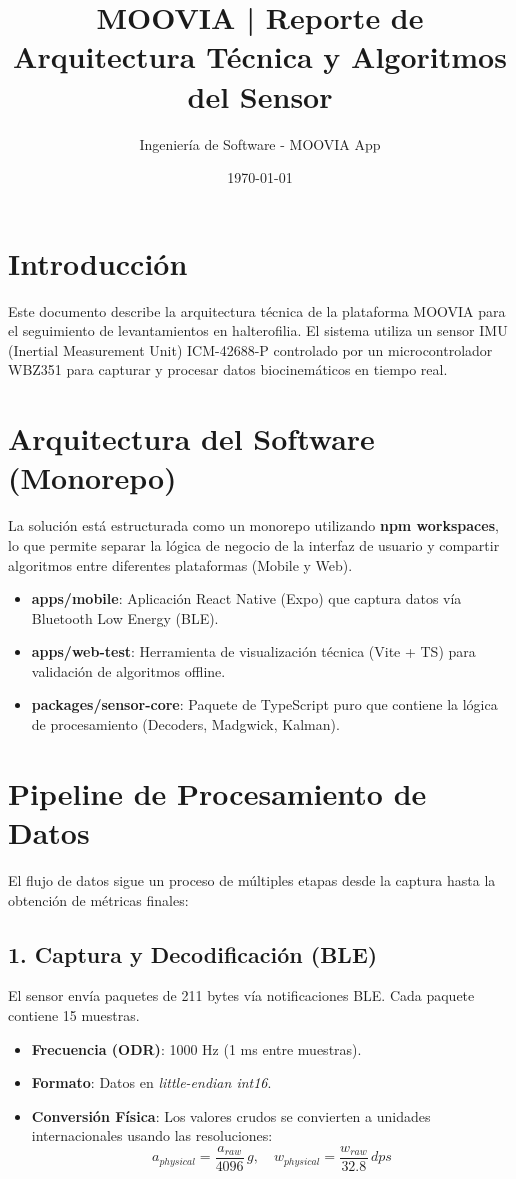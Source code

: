 \documentclass[11pt,a4paper,oneside]{article}
\title{MOOVIA | Reporte de Arquitectura Técnica y Algoritmos del Sensor}
\author{Ingeniería de Software - MOOVIA App}
\date{\today}
\begin{document}
\maketitle
\tableofcontents
\newpage

\section{Introducción}
Este documento describe la arquitectura técnica de la plataforma MOOVIA para el seguimiento de levantamientos en halterofilia. El sistema utiliza un sensor IMU (Inertial Measurement Unit) ICM-42688-P controlado por un microcontrolador WBZ351 para capturar y procesar datos biocinemáticos en tiempo real.

\section{Arquitectura del Software (Monorepo)}
La solución está estructurada como un monorepo utilizando \textbf{npm workspaces}, lo que permite separar la lógica de negocio de la interfaz de usuario y compartir algoritmos entre diferentes plataformas (Mobile y Web).

\begin{itemize}
    \item \textbf{apps/mobile}: Aplicación React Native (Expo) que captura datos vía Bluetooth Low Energy (BLE).
    \item \textbf{apps/web-test}: Herramienta de visualización técnica (Vite + TS) para validación de algoritmos offline.
    \item \textbf{packages/sensor-core}: Paquete de TypeScript puro que contiene la lógica de procesamiento (Decoders, Madgwick, Kalman).
\end{itemize}

\section{Pipeline de Procesamiento de Datos}
El flujo de datos sigue un proceso de múltiples etapas desde la captura hasta la obtención de métricas finales:

\subsection{1. Captura y Decodificación (BLE)}
El sensor envía paquetes de 211 bytes vía notificaciones BLE. Cada paquete contiene 15 muestras.
\begin{itemize}
    \item \textbf{Frecuencia (ODR)}: 1000 Hz (1 ms entre muestras).
    \item \textbf{Formato}: Datos en \textit{little-endian int16}.
    \item \textbf{Conversión Física}: Los valores crudos se convierten a unidades internacionales usando las resoluciones:
    \begin{equation}
        a_{physical} = \frac{a_{raw}}{4096} \, g, \quad w_{physical} = \frac{w_{raw}}{32.8} \, dps
    \end{equation}
\end{itemize}
\end{document}
